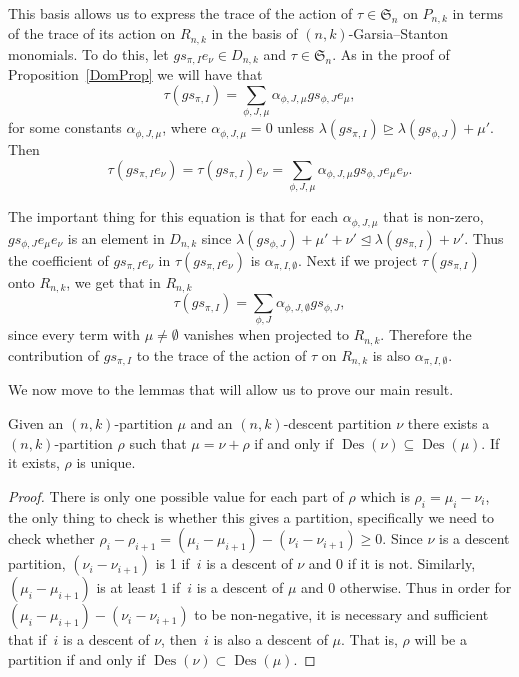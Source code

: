 \documentclass[ALCO,ThmDefs,Unicode,epreuves]{cedram}
\DeclareMathOperator{\Des}{Des}
\begin{document}
This basis allows us to express the trace of the action of $\tau \in \mathfrak{S}_n$ on $P_{n,k}$ in terms of the trace of its 
action on $R_{n,k}$ in the basis of $(n,k)$-Garsia--Stanton monomials. To do this, let $gs_{\pi,I}e_\nu\in D_{n,k}$ and 
$\tau\in\mathfrak{S}_n$. As in the proof of Proposition~\ref{DomProp} we will have that 
\begin{equation}
\tau(gs_{\pi,I})=\sum_{\phi,J,\mu} \alpha_{\phi,J,\mu} gs_{\phi,J}e_\mu,
\end{equation}
for some constants $\alpha_{\phi,J,\mu}$, 
where $\alpha_{\phi,J,\mu}=0$ unless $\lambda(gs_{\pi,I}) \trianglerighteq \lambda(gs_{\phi,J})+\mu'$. Then 
\begin{equation}
\tau(gs_{\pi,I}e_\nu)=\tau(gs_{\pi,I})e_\nu=\sum_{\phi,J,\mu} \alpha_{\phi,J,\mu} gs_{\phi,J}e_\mu e_\nu.
\end{equation}

The important thing for this equation is that for each $\alpha_{\phi,J,\mu}$ that is non-zero, $gs_{\phi,J}e_\mu e_\nu$ is an 
element in $D_{n,k}$ since $\lambda(gs_{\phi,J})+\mu'+\nu'\trianglelefteq \lambda(gs_{\pi,I})+\nu'$. Thus the coefficient of 
$gs_{\pi,I}e_\nu$ in $\tau(gs_{\pi,I}e_\nu)$ is $\alpha_{\pi,I,\emptyset}$. Next if we project $\tau(gs_{\pi,I})$ onto 
$R_{n,k}$, we get that in $R_{n,k}$ 
\begin{equation}
\tau(gs_{\pi,I})=\sum_{\phi,J} \alpha_{\phi,J,\emptyset} 
gs_{\phi,J},
\end{equation}
 since every term with $\mu\neq \emptyset$ vanishes when projected to $R_{n,k}$. Therefore the 
contribution of $gs_{\pi,I}$ to the trace of the action of $\tau$ on $R_{n,k}$ is also $\alpha_{\pi,I,\emptyset}$.


We now move to the lemmas that will allow us to prove our main result.
	
\begin{lemm}

\label{DecomLem}
 Given an $(n,k)$-partition $\mu$ and an $(n,k)$-descent partition $\nu$ there exists a $(n,k)$-partition $\rho$ such that 
$\mu=\nu+\rho$ if and only if $\Des (\nu)\subseteq \Des (\mu)$. If it exists, $\rho$ is unique.

	\begin{proof}
		There is only one possible value for each part of $\rho$ which is $\rho_i=\mu_i-\nu_i$, the only thing to check is 
whether this gives a partition, specifically we need to check whether 
$\rho_i-\rho_{i+1}=(\mu_i-\mu_{i+1})-(\nu_i-\nu_{i+1})\geq 0$. Since $\nu$ is a descent partition, $(\nu_i-\nu_{i+1})$ 
is 1 if~$i$ is a descent of $\nu$ and 0 if it is not. Similarly, $(\mu_i-\mu_{i+1})$ is at least 1 if~$i$ is a 
descent of $\mu$ and 0 otherwise. Thus in order for $(\mu_i-\mu_{i+1})-(\nu_i-\nu_{i+1})$ to be non-negative, it is 
necessary and sufficient that if~$i$ is a descent of $\nu$, then~$i$ is also a descent of $\mu$. That is, $\rho$ 
will be a partition if and only if $\Des (\nu)\subset \Des (\mu)$.
	\end{proof}
\end{lemm}
\end{document}
